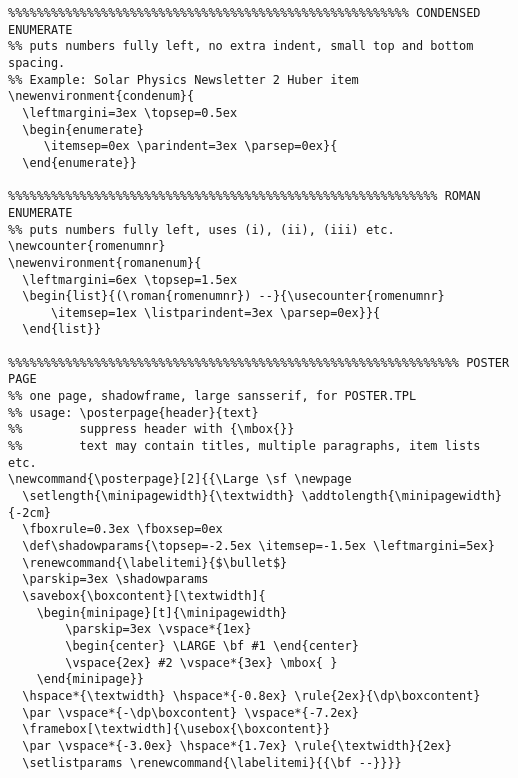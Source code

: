 {\begin{verbatim}
%%%%%%%%%%%%%%%%%%%%%%%%%%%%%%%%%%%%%%%%%%%%%%%%%%%%%%%% CONDENSED ENUMERATE
%% puts numbers fully left, no extra indent, small top and bottom spacing.
%% Example: Solar Physics Newsletter 2 Huber item
\newenvironment{condenum}{               
  \leftmargini=3ex \topsep=0.5ex 
  \begin{enumerate}
     \itemsep=0ex \parindent=3ex \parsep=0ex}{
  \end{enumerate}}        

%%%%%%%%%%%%%%%%%%%%%%%%%%%%%%%%%%%%%%%%%%%%%%%%%%%%%%%%%%%% ROMAN ENUMERATE
%% puts numbers fully left, uses (i), (ii), (iii) etc.                 
\newcounter{romenumnr}
\newenvironment{romanenum}{
  \leftmargini=6ex \topsep=1.5ex
  \begin{list}{(\roman{romenumnr}) --}{\usecounter{romenumnr}
      \itemsep=1ex \listparindent=3ex \parsep=0ex}}{
  \end{list}}

%%%%%%%%%%%%%%%%%%%%%%%%%%%%%%%%%%%%%%%%%%%%%%%%%%%%%%%%%%%%%%% POSTER PAGE
%% one page, shadowframe, large sansserif, for POSTER.TPL
%% usage: \posterpage{header}{text}  
%%        suppress header with {\mbox{}}
%%        text may contain titles, multiple paragraphs, item lists etc.
\newcommand{\posterpage}[2]{{\Large \sf \newpage
  \setlength{\minipagewidth}{\textwidth} \addtolength{\minipagewidth}{-2cm}
  \fboxrule=0.3ex \fboxsep=0ex
  \def\shadowparams{\topsep=-2.5ex \itemsep=-1.5ex \leftmargini=5ex}
  \renewcommand{\labelitemi}{$\bullet$}
  \parskip=3ex \shadowparams
  \savebox{\boxcontent}[\textwidth]{
    \begin{minipage}[t]{\minipagewidth}
        \parskip=3ex \vspace*{1ex}
        \begin{center} \LARGE \bf #1 \end{center} 
        \vspace{2ex} #2 \vspace*{3ex} \mbox{ }
    \end{minipage}}
  \hspace*{\textwidth} \hspace*{-0.8ex} \rule{2ex}{\dp\boxcontent}
  \par \vspace*{-\dp\boxcontent} \vspace*{-7.2ex}
  \framebox[\textwidth]{\usebox{\boxcontent}}
  \par \vspace*{-3.0ex} \hspace*{1.7ex} \rule{\textwidth}{2ex}
  \setlistparams \renewcommand{\labelitemi}{{\bf --}}}}


\end{verbatim}}
